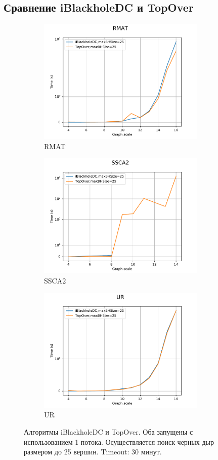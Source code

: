 \documentclass[12pt,a4paper,oneside,openany]{article}
\theoremstyle{definition}
\theoremstyle{lemma}
\theoremstyle{remark}
\begin{document}
\subsection{Сравнение iBlackholeDC и TopOver}\label{subsec:topovercomparison}

\begin{figure}[H]
    \begin{subfigure}{.5\textwidth}
      \centering
      \includegraphics[width=8cm]{images/2_RMAT.pdf}
      \caption{RMAT}
      \label{fig:topochi:rmat}
    \end{subfigure}
    \begin{subfigure}{.5\textwidth}
      \centering
      \includegraphics[width=8cm]{images/2_SSCA2.pdf}
      \caption{SSCA2}
      \label{fig:topochi:ssca}
    \end{subfigure}
    \begin{subfigure}{.5\textwidth}
      \centering
      \includegraphics[width=8cm]{images/2_UR.pdf}
      \caption{UR}
      \label{fig:topochi:ur}
    \end{subfigure}
    \caption{Алгоритмы iBlackholeDC и TopOver. Оба запущены с использованием 1 потока. Осуществляется поиск черных дыр размером до 25 вершин. Timeout: 30 минут.}
    \label{fig:topochi}
\end{figure}
\end{document}
